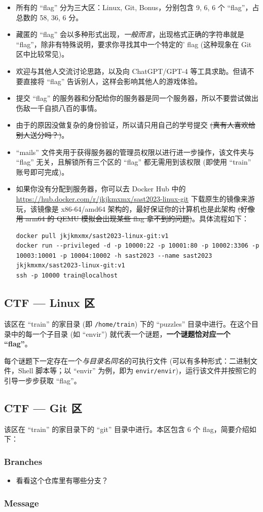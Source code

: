 \documentclass{article}
\begin{document}
	\begin{itemize}
		\itemsep0pt
		\item 所有的 ``flag'' 分为三大区：Linux, Git, Bonus，分别包含 9, 6, 6 个 ``flag''，占总数的 58, 36, 6 分。
		\item 藏匿的 ``flag'' 会以多种形式出现，\textit{一般而言}，出现格式正确的字符串就是 ``flag''，除非有特殊说明，要求你寻找其中一个特定的' flag (这种现象在 Git 区中比较常见)。
		\item 欢迎与其他人交流讨论思路，以及向 ChatGPT/GPT-4 等工具求助。但请不要直接将 ``flag'' 告诉别人，这样会影响其他人的游戏体验。
		\item 提交 ``flag'' 的服务器和分配给你的服务器是同一个服务器，所以不要尝试做出伤敌一千自损八百的事情。
		\item 由于的原因没做复杂的身份验证，所以请只用自己的学号提交 \sout{(真有人喜欢给别人送分吗？)}。
		\item ``mails'' 文件夹用于获得服务器的管理员权限以进行进一步操作，该文件夹与 ``flag'' 无关，且解锁所有三个区的 ``flag'' 都无需用到该权限 (即使用 ``train'' 账号即可完成)。
		\item 如果你没有分配到服务器，你可以去 Docker Hub 中的 \url{https://hub.docker.com/r/jkjkmxmx/sast2023-linux-git} 下载原生的镜像来游玩，该镜像是 x86-64/amd64 架构的，最好保证你的计算机也是此架构 \sout{(好像用 arm64 的 QEMU 模拟会出现某些 flag 拿不到的问题)}。具体流程如下：
		\begin{verbatim}
docker pull jkjkmxmx/sast2023-linux-git:v1
docker run --privileged -d -p 10000:22 -p 10001:80 -p 10002:3306 -p 10003:10001 -p 10004:10002 -h sast2023 --name sast2023 jkjkmxmx/sast2023-linux-git:v1
ssh -p 10000 train@localhost
		\end{verbatim}
	\end{itemize}

	\subsection{CTF --- Linux 区}

	该区在 ``train'' 的家目录 (即 \texttt{/home/train}) 下的 ``puzzles'' 目录中进行。在这个目录中的每一个子目录 (如 ``envir'') 就代表一个谜题，\textbf{一个谜题恰对应一个 ``flag''}。

	每个谜题下一定存在一个\textit{与目录名同名}的可执行文件 (可以有多种形式：二进制文件，Shell 脚本等；以 ``envir'' 为例，即为 \texttt{envir/envir})，运行该文件并按照它的引导一步步获取 ``flag''。

	\subsection{CTF --- Git 区}

	该区在 ``train'' 的家目录下的 ``git'' 目录中进行。本区包含 6 个 flag，简要介绍如下：

	\subsubsection{Branches}

	\begin{itemize}
		\item 看看这个仓库里有哪些分支？
	\end{itemize}

	\subsubsection{Message}

	\beg
\end{document}
